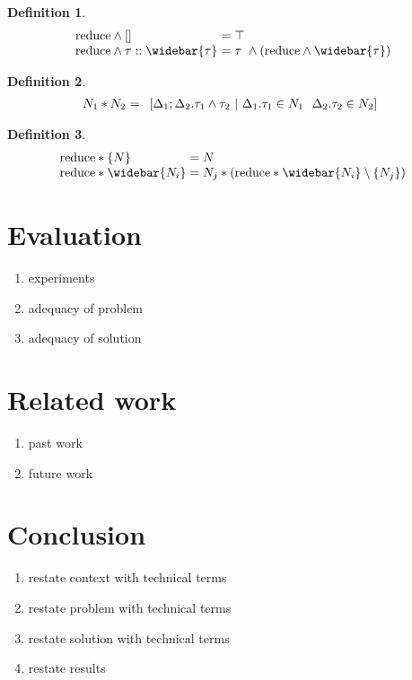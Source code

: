 \documentclass[manuscript]{acmart}
\theoremstyle{definition}
\newtheorem{definition}{Definition}[section]
\begin{document}
\begin{definition}
\[
  \begin{array}{l @{} l}
  \text{reduce} \wedge [] 
  &\ = \top
  \\
  \text{reduce} \wedge \tau::\widebar{\tau}
  &\ = \tau\ \wedge (\text{reduce} \wedge \widebar{\tau})
  \end{array}
\]
\end{definition}

\begin{definition}
\[
  \begin{array}{l @{} l}
    N_1 * N_2
    &\ = 
    \begin{array}[t]{l}
      [ \Delta_1 ; \Delta_2 . \tau_1 \wedge \tau_2 \ |\ 
        \Delta_1.\tau_1 \in N_1
        \ \ 
        \Delta_2.\tau_2 \in N_2
      ]
    \end{array}
  \end{array}
\]
\end{definition}

\begin{definition}
\[
  \begin{array}{l @{}l}
  \text{reduce} * \{N\}
  & {}= N
  \\
  \text{reduce} * \widebar{N_i}
  & {}= N_j * (\text{reduce} * \widebar{N_i}\setminus\{N_j\})
  \end{array}
\]
\end{definition}

\section{Evaluation}
\begin{enumerate}
  \item experiments 
  \item adequacy of problem 
  \item adequacy of solution 
\end{enumerate}

\section{Related work}
\begin{enumerate}
  \item past work 
  \item future work 
\end{enumerate}

\section{Conclusion}
\begin{enumerate}
  \item restate context with technical terms 
  \item restate problem with technical terms 
  \item restate solution with technical terms 
  \item restate results 
\end{enumerate}
\end{document}
